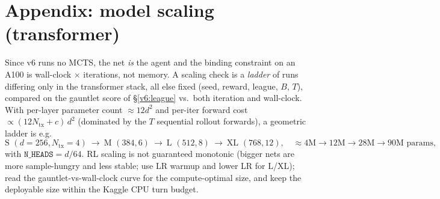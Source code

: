 \documentclass[11pt]{article}
\newcommand{\cd}[1]{\texttt{#1}}
\begin{document}
\section{Appendix: model scaling (transformer)}\label{v6:scaling}
Since v6 runs no MCTS, the net \emph{is} the agent and the binding constraint on an A100 is wall-clock
$\times$ iterations, not memory. A scaling check is a \emph{ladder} of runs differing only in the
transformer stack, all else fixed (seed, reward, league, $B$, $T$), compared on the gauntlet score of
\S\ref{v6:league} vs.\ both iteration and wall-clock. With per-layer parameter count $\approx 12d^2$ and
per-iter forward cost $\propto (12 N_{\mathrm{tx}}{+}c)\,d^2$ (dominated by the $T$ sequential rollout
forwards), a geometric ladder is e.g.
\[
\text{S }(d{=}256,N_{\mathrm{tx}}{=}4)\ \to\ \text{M }(384,6)\ \to\ \text{L }(512,8)\ \to\ \text{XL }(768,12),
\quad \approx 4\text{M}\to12\text{M}\to28\text{M}\to90\text{M params},
\]
with $\cd{N\_HEADS}=d/64$. RL scaling is not guaranteed monotonic (bigger nets are more sample-hungry and
less stable; use LR warmup and lower LR for L/XL); read the gauntlet-vs-wall-clock curve for the
compute-optimal size, and keep the deployable size within the Kaggle CPU turn budget.
\end{document}
